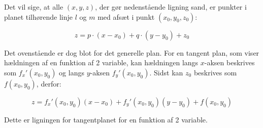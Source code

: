 \begin{proofw}
Det vil sige, at alle $(x,y,z)$, der gør nedenstående ligning sand, er punkter i planet tilhørende
linje $l$ og $m$ med afsæt i punkt $(x_0,y_0,z_0)$:

$$
z=p \cdot (x-x_0)+q \cdot (y-y_0) + z_0
$$

Det ovenstående er dog blot for det generelle plan.
For en tangent plan, som viser hældningen af en funktion af 2 variable,
kan hældningen langs $x$-aksen beskrives som $f_x'(x_0,y_0)$
og langs $y$-aksen $f_y'(x_0,y_0)$.
Sidst kan $z_0$ beskrives som $f(x_0,y_0)$, derfor:

$$
    z=f_x'(x_0,y_0)(x-x_0)+
    f_y'(x_0,y_0)(y-y_0)+
    f(x_0,y_0)
$$

Dette er ligningen for tangentplanet for en funktion af 2 variable.

\end{proofw}
